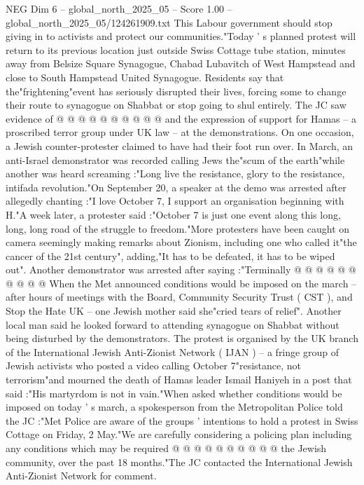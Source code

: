 \begin{textsample}{NEG Dim 6 – global\_north\_2025\_05 – Score 1.00 – global\_north\_2025\_05/124261909.txt}
This Labour government should stop giving in to activists and protect our communities."Today ' s planned protest will return to its previous location just outside Swiss Cottage tube station, minutes away from Belsize Square Synagogue, Chabad Lubavitch of West Hampstead and close to South Hampstead United Synagogue.
Residents say that the"frightening"event has seriously disrupted their lives, forcing some to change their route to synagogue on Shabbat or stop going to shul entirely.
The JC saw evidence of @ @ @ @ @ @ @ @ @ @ and the expression of support for Hamas -- a proscribed terror group under UK law -- at the demonstrations.
On one occasion, a Jewish counter-protester claimed to have had their foot run over.
In March, an anti-Israel demonstrator was recorded calling Jews the"scum of the earth"while another was heard screaming :"Long live the resistance, glory to the resistance, intifada revolution."On September 20, a speaker at the demo was arrested after allegedly chanting :"I love October 7, I support an organisation beginning with H."A week later, a protester said :"October 7 is just one event along this long, long, long road of the struggle to freedom."More protesters have been caught on camera seemingly making remarks about Zionism, including one who called it"the cancer of the 21st century", adding,"It has to be defeated, it has to be wiped out".
Another demonstrator was arrested after saying :"Terminally @ @ @ @ @ @ @ @ @ @ When the Met announced conditions would be imposed on the march -- after hours of meetings with the Board, Community Security Trust ( CST ), and Stop the Hate UK -- one Jewish mother said she"cried tears of relief".
Another local man said he looked forward to attending synagogue on Shabbat without being disturbed by the demonstrators.
The protest is organised by the UK branch of the International Jewish Anti-Zionist Network ( IJAN ) -- a fringe group of Jewish activists who posted a video calling October 7"resistance, not terrorism"and mourned the death of Hamas leader Ismail Haniyeh in a post that said :"His martyrdom is not in vain."When asked whether conditions would be imposed on today ' s march, a spokesperson from the Metropolitan Police told the JC :"Met Police are aware of the groups ' intentions to hold a protest in Swiss Cottage on Friday, 2 May."We are carefully considering a policing plan including any conditions which may be required @ @ @ @ @ @ @ @ @ @ the Jewish community, over the past 18 months."The JC contacted the International Jewish Anti-Zionist Network for comment.

\end{textsample}
